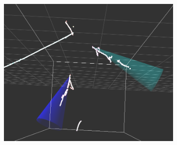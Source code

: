 \begin{figure}[htbp]
\begin{center}
\begin{subfigure}{0.45\textwidth}
\includegraphics[width=0.95\linewidth]{figs/datapi0/evd/Run5975Subrun85Evt4262.png}
\caption{}
\end{subfigure}
\begin{subfigure}{0.45\textwidth}

\end{subfigure}
\end{center}
\end{figure}
